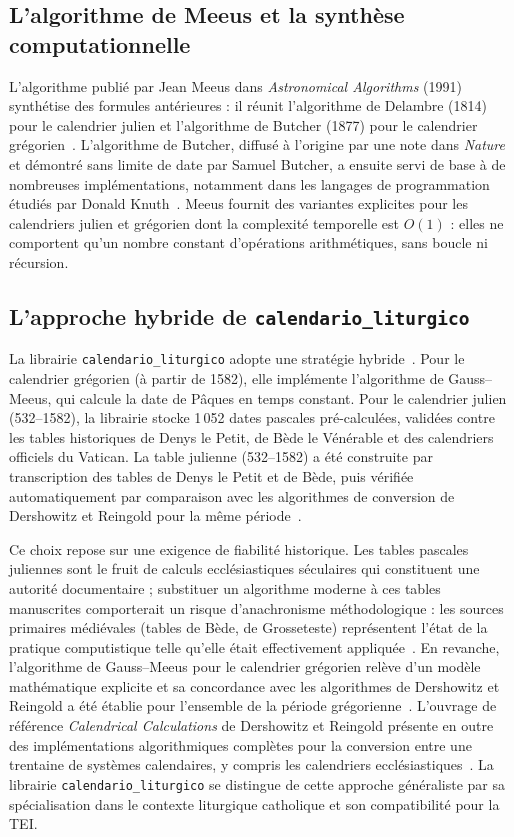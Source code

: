 \documentclass[final, fra]{anthology-ch}     %
\begin{document}
\subsection{L'algorithme de Meeus et la synthèse computationnelle} \label{sec:meeus}

L'algorithme publié par Jean Meeus dans \textit{Astronomical Algorithms} (1991) synthétise des formules antérieures : il réunit l'algorithme de Delambre (1814) pour le calendrier julien et l'algorithme de Butcher (1877) pour le calendrier grégorien~\cite{meeus1991}. L'algorithme de Butcher, diffusé à l'origine par une note dans \textit{Nature} et démontré sans limite de date par Samuel Butcher, a ensuite servi de base à de nombreuses implémentations, notamment dans les langages de programmation étudiés par Donald Knuth~\cite{bien2004,knuth1962}. Meeus fournit des variantes explicites pour les calendriers julien et grégorien dont la complexité temporelle est $O(1)$ : elles ne comportent qu'un nombre constant d'opérations arithmétiques, sans boucle ni récursion.

\subsection{L'approche hybride de \texttt{calendario\_liturgico}} \label{sec:hybride}

La librairie \texttt{calendario\_liturgico} adopte une stratégie hybride~\cite{echavarria2025pypi}. Pour le calendrier grégorien (à partir de 1582), elle implémente l'algorithme de Gauss--Meeus, qui calcule la date de Pâques en temps constant. Pour le calendrier julien (532--1582), la librairie stocke 1\,052 dates pascales pré-calculées, validées contre les tables historiques de Denys le Petit, de Bède le Vénérable et des calendriers officiels du Vatican. La table julienne (532--1582) a été construite par transcription des tables de Denys le Petit et de Bède, puis vérifiée automatiquement par comparaison avec les algorithmes de conversion de Dershowitz et Reingold pour la même période~\cite{dershowitz2018}.

Ce choix repose sur une exigence de fiabilité historique. Les tables pascales juliennes sont le fruit de calculs ecclésiastiques séculaires qui constituent une autorité documentaire ; substituer un algorithme moderne à ces tables manuscrites comporterait un risque d'anachronisme méthodologique : les sources primaires médiévales (tables de Bède, de Grosseteste) représentent l'état de la pratique computistique telle qu'elle était effectivement appliquée~\cite{bede725}. En revanche, l'algorithme de Gauss--Meeus pour le calendrier grégorien relève d'un modèle mathématique explicite et sa concordance avec les algorithmes de Dershowitz et Reingold a été établie pour l'ensemble de la période grégorienne~\cite{dershowitz2018}. L'ouvrage de référence \textit{Calendrical Calculations} de Dershowitz et Reingold présente en outre des implémentations algorithmiques complètes pour la conversion entre une trentaine de systèmes calendaires, y compris les calendriers ecclésiastiques~\cite{dershowitz2018}. La librairie \texttt{calendario\_liturgico} se distingue de cette approche généraliste par sa spécialisation dans le contexte liturgique catholique et son compatibilité pour la TEI.
\end{document}
